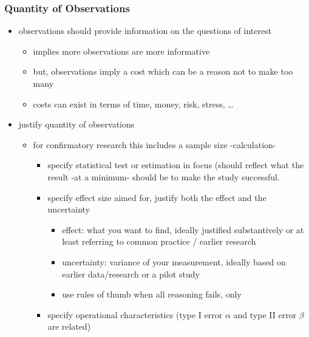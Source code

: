 \documentclass[]{article}
\providecommand{\tightlist}{%
  \setlength{\itemsep}{0pt}\setlength{\parskip}{0pt}}
\begin{document}
\subsubsection{Quantity of Observations}\label{quantity-of-observations}

\begin{itemize}
\tightlist
\item
  observations should provide information on the questions of interest

  \begin{itemize}
  \tightlist
  \item
    implies more observations are more informative
  \item
    but, observations imply a cost which can be a reason not to make too
    many
  \item
    costs can exist in terms of time, money, risk, stress, \ldots{} 
  \end{itemize}
\item
  justify quantity of observations

  \begin{itemize}
  \tightlist
  \item
    for confirmatory research this includes a sample size -calculation-

    \begin{itemize}
    \tightlist
    \item
      specify statistical test or estimation in focus (should reflect
      what the result -at a minimum- should be to make the study
      successful.
    \item
      specify effect size aimed for, justify both the effect and the
      uncertainty

      \begin{itemize}
      \tightlist
      \item
        effect: what you want to find, ideally justified substantively
        or at least referring to common practice / earlier research
      \item
        uncertainty: variance of your measurement, ideally based on
        earlier data/research or a pilot study
      \item
        use rules of thumb when all reasoning fails, only
      \end{itemize}
    \item
      specify operational characteristics (type I error \(\alpha\) and
      type II error \(\beta\) are related)


\end{itemize}
\end{itemize}
\end{itemize}
\end{document}
